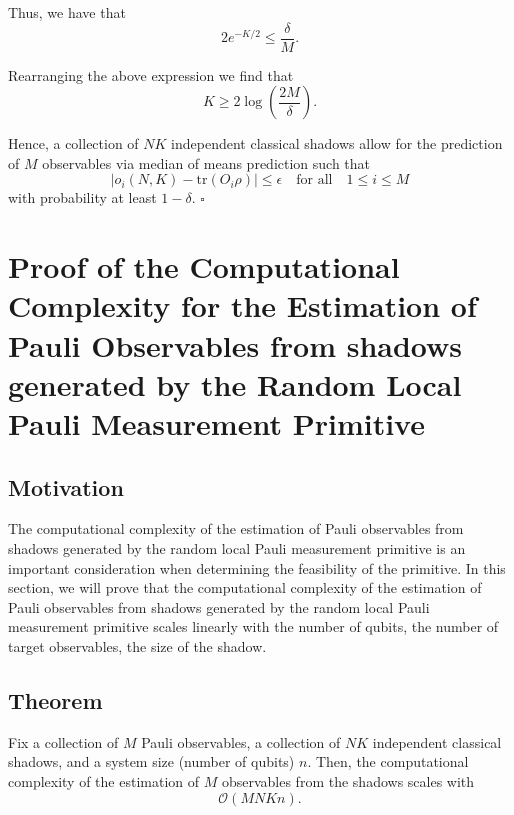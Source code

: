 \documentclass[12pt]{article}
\begin{document}
    Thus, we have that
    \begin{equation*}
        2e^{-K/2} \leq \frac{\delta}{M}.
    \end{equation*}

    Rearranging the above expression we find that
    \begin{equation*}
        K \geq 2\log{\left(\frac{2M}{\delta}\right)}.
    \end{equation*}

    Hence, a collection of $NK$ independent classical shadows allow for the prediction of $M$ observables via median of means prediction such that
    \begin{equation*}
        |\hat{o}_i(N,K) - \text{tr}(O_i\rho)| \leq \epsilon \quad \text{for all} \quad 1 \leq i \leq M
    \end{equation*}
    with probability at least $1-\delta$.
    \hfill $\square$

    \section{Proof of the Computational Complexity for the Estimation of Pauli Observables from shadows generated by the Random Local Pauli Measurement Primitive}

    \subsection{Motivation}
    The computational complexity of the estimation of Pauli observables from shadows generated by the random local Pauli measurement primitive is an important consideration when determining the feasibility of the primitive. In this section, we will prove that the computational complexity of the estimation of Pauli observables from shadows generated by the random local Pauli measurement primitive scales linearly with the number of qubits, the number of target observables, the size of the shadow.

    \subsection{Theorem}
    Fix a collection of $M$ Pauli observables, a collection of $NK$ independent classical shadows, and a system size (number of qubits) $n$. Then, the computational complexity of the estimation of $M$ observables from the shadows scales with
    \begin{equation*}
        \mathcal{O}\left(MNKn\right).
    \end{equation*}
\end{document}
